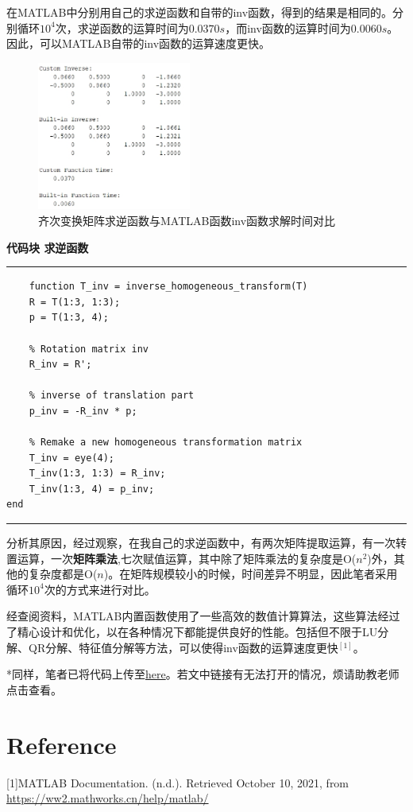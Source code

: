 \documentclass{ctexart}
\begin{document}
在MATLAB中分别用自己的求逆函数和自带的inv函数，得到的结果是相同的。分别循环$10^4$次，求逆函数的运算时间为$0.0370s$，而inv函数的运算时间为$0.0060s$。因此，可以MATLAB自带的inv函数的运算速度更快。

\begin{figure}[h]
	\centering
	\includegraphics[width=0.45\textwidth]{Image/2-5.png}
	\caption{齐次变换矩阵求逆函数与MATLAB函数inv函数求解时间对比}
\end{figure}


\textbf{代码块 { }  { } 求逆函数}\par

\vspace{5pt}
\hrule

\begin{verbatim}
	function T_inv = inverse_homogeneous_transform(T)
    R = T(1:3, 1:3);
    p = T(1:3, 4);
 
    % Rotation matrix inv
    R_inv = R';
    
    % inverse of translation part
    p_inv = -R_inv * p;
    
    % Remake a new homogeneous transformation matrix
    T_inv = eye(4);
    T_inv(1:3, 1:3) = R_inv;
    T_inv(1:3, 4) = p_inv;
end
\end{verbatim}
\hrule
\vspace{5pt}

分析其原因，经过观察，在我自己的求逆函数中，有两次矩阵提取运算，有一次转置运算，一次\textbf{矩阵乘法},七次赋值运算，其中除了矩阵乘法的复杂度是O($n^2$)外，其他的复杂度都是O($n$)。在矩阵规模较小的时候，时间差异不明显，因此笔者采用循环$10^4$次的方式来进行对比。

经查阅资料，MATLAB内置函数使用了一些高效的数值计算算法，这些算法经过了精心设计和优化，以在各种情况下都能提供良好的性能。包括但不限于LU分解、QR分解、特征值分解等方法，可以使得inv函数的运算速度更快$^{[1]}$。

*同样，笔者已将代码上传至\href{https://github.com/Racheus/Robotics-Caprice/tree/master/Homework2-Mathematic-foundations}{here}。若文中链接有无法打开的情况，烦请助教老师点击查看。
\section*{Reference}

[1]MATLAB Documentation. (n.d.). Retrieved October 10, 2021, from \url{https://ww2.mathworks.cn/help/matlab/}
\end{document}
